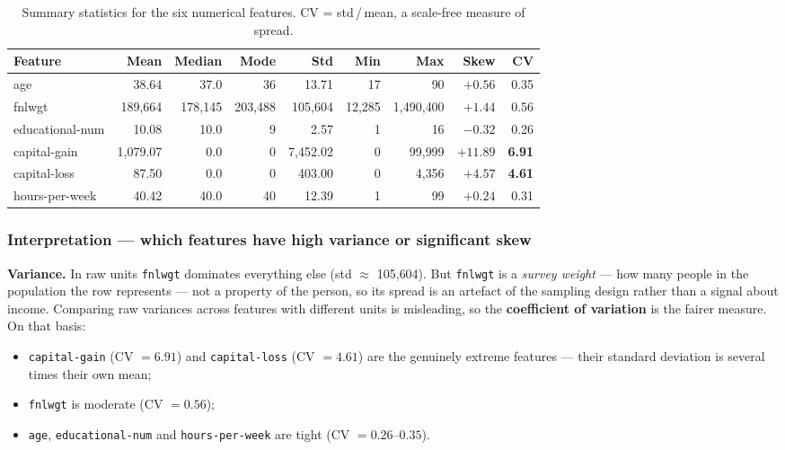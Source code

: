 \documentclass[11pt,a4paper]{article}
\newcommand{\code}[1]{\texttt{\small #1}}
\begin{document}
\begin{table}[H]
\centering
\caption{Summary statistics for the six numerical features. CV = std\,/\,mean, a
scale-free measure of spread.}
\small
\begin{adjustbox}{max width=\linewidth}
\begin{tabular}{lrrrrrrrr}
\toprule
\textbf{Feature} & \textbf{Mean} & \textbf{Median} & \textbf{Mode} & \textbf{Std} &
\textbf{Min} & \textbf{Max} & \textbf{Skew} & \textbf{CV} \\
\midrule
age             & 38.64      & 37.0     & 36      & 13.71      & 17 & 90        & $+0.56$ & 0.35 \\
fnlwgt          & 189{,}664  & 178{,}145& 203{,}488 & 105{,}604 & 12{,}285 & 1{,}490{,}400 & $+1.44$ & 0.56 \\
educational-num & 10.08      & 10.0     & 9       & 2.57       & 1  & 16        & $-0.32$ & 0.26 \\
capital-gain    & 1{,}079.07 & 0.0      & 0       & 7{,}452.02 & 0  & 99{,}999  & $\mathbf{+11.89}$ & \textbf{6.91} \\
capital-loss    & 87.50      & 0.0      & 0       & 403.00     & 0  & 4{,}356   & $\mathbf{+4.57}$  & \textbf{4.61} \\
hours-per-week  & 40.42      & 40.0     & 40      & 12.39      & 1  & 99        & $+0.24$ & 0.31 \\
\bottomrule
\end{tabular}
\end{adjustbox}
\end{table}

\subsubsection*{Interpretation --- which features have high variance or significant skew}

\textbf{Variance.} In raw units \code{fnlwgt} dominates everything else
(std $\approx$ 105{,}604). But \code{fnlwgt} is a \emph{survey weight} --- how many people
in the population the row represents --- not a property of the person, so its spread is an
artefact of the sampling design rather than a signal about income. Comparing raw variances
across features with different units is misleading, so the \textbf{coefficient of
variation} is the fairer measure. On that basis:

\begin{itemize}
  \item \code{capital-gain} (CV $=6.91$) and \code{capital-loss} (CV $=4.61$) are the
        genuinely extreme features --- their standard deviation is several times their own
        mean;
  \item \code{fnlwgt} is moderate (CV $=0.56$);
  \item \code{age}, \code{educational-num} and \code{hours-per-week} are tight
        (CV $=0.26$--$0.35$).
\end{itemize}
\end{document}
